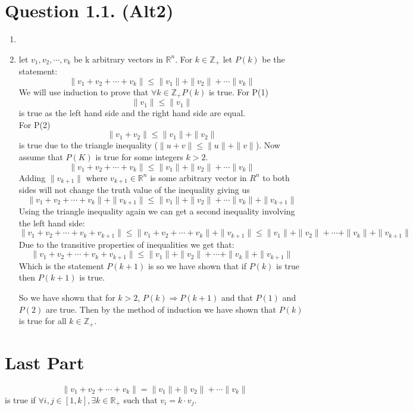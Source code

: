 \documentclass[11pt,a4paper]{article}
\newcommand{\Z}{\mathbb{Z}}
\newcommand{\R}{\mathbb{R}}
\begin{document}
    \section*{Question 1.1. (Alt2)}

    \begin{enumerate}[label=\alph*.]
        \item
        \item let $v_1, v_2, \cdots , v_k$ be k arbitrary vectors in $\R^n$. For $k \in \Z_{+}$ let $P(k)$  be the statement:
            \[
                \| v_1 + v_2 + \cdots + v_k \| \leq \| v_1 \| + \| v_2 \| + \cdots \| v_k \|
            \]
        We will use induction to prove that $\forall k \in \Z_+ P(k)$ is true.
        For P(1) \[
            \| v_1 \| \leq \| v_1 \| 
        \] 
        is true as the left hand side and the right hand side are equal. \\
        For P(2) \[
            \| v_1 + v_2 \| \leq \| v_1 \| + \| v_2 \|      
        \] is true due to the triangle inequality ($ \| u + v \| \leq \| u \| + \| v \| $).
        Now assume that $P(K)$ is true for some integers $k > 2$.
        \[
            \| v_1 + v_2 + \cdots + v_k \| \leq \| v_1 \| + \| v_2 \| + \cdots \| v_k \|
        \]
        Adding $\| v_{k+1} \|$ where $v_{k+1} \in \R^n$ is some arbitrary vector in $R^n$ to both sides will not change the truth value of the inequality giving us
        \[
            \| v_1 + v_2 + \cdots + v_k \| + \| v_{k+1} \|  \leq \| v_1 \| + \| v_2 \| + \cdots \| v_k \| + \| v_{k+1} \| 
        \]
        Using the triangle inequality again we can get a second inequality involving the left hand side:
        \[
            \| v_1 + v_2 + \cdots + v_k + v_{k+1}\|\leq \| v_1 + v_2 + \cdots + v_k \| + \| v_{k+1} \|  \leq \| v_1 \| + \| v_2 \| + \cdots + \| v_k \| + \| v_{k+1} \| 
        \]
        Due to the transitive properties of inequalities we get that:
        \[
            \| v_1 + v_2 + \cdots + v_k + v_{k+1}\| \leq \| v_1 \| + \| v_2 \| + \cdots + \| v_k \| + \| v_{k+1} \| 
        \]
        Which is the statement $P(k+1)$ is so we have shown that if $P(k)$ is true then $P(k+1)$ is true.

        So we have shown that for $k > 2$, $P(k) \Rightarrow P(k+1)$ and that $P(1)$ and $P(2)$ are true. Then by the method of induction we have shown that $P(k)$ is true for all $k \in \Z_+$.

    \end{enumerate}


    \section*{Last Part}
    \[
        \| v_1 + v_2 + \cdots + v_k \| = \| v_1 \| + \| v_2 \| + \cdots \| v_k \|
    \]
    is true if $\forall i,j \in [1,k] , \exists k \in \R_{+}$ such that $v_i = k \cdot v_j$.
\end{document}
